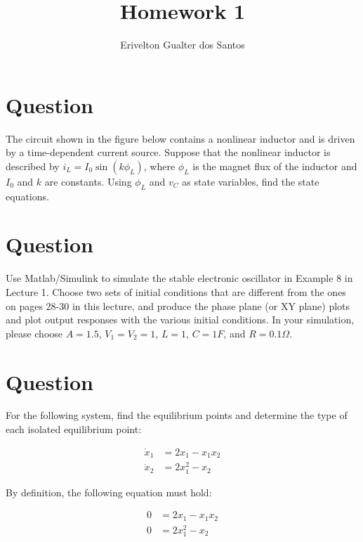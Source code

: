 \documentclass[a4paper,10pt]{article}
\title{Homework 1}
\author{Erivelton Gualter dos Santos}
\begin{document}
\maketitle

\begin{abstract}

\end{abstract}

\section{Question}

The circuit shown in the figure below contains a nonlinear inductor and is driven by a time-dependent current source. Suppose that the nonlinear inductor is described by $i_L =I_0\sin(k\phi_L)$, where $\phi_L$ is the magnet flux of the inductor and $I_0$ and $k$ are constants. Using $\phi_L$ and $v_C$ as state variables, find the state equations.

\section{Question}
Use Matlab/Simulink to simulate the stable electronic oscillator in Example 8 in Lecture 1. Choose two sets of initial conditions that are different from the ones on pages 28-30 in this lecture, and produce the phase plane (or XY plane) plots and
plot output responses with the various initial conditions. 
In your simulation, please choose $A=1.5$, $V_1 =V_2 =1$, $L=1$, $C=1F$, and $R=0.1\Omega$.

\section{Question}
For the following system, find the equilibrium points and determine the type of each isolated equilibrium point:

\begin{eqnarray*}
\dot{x}_1 &= 2{x}_1 - {x}_1{x}_2 \\
\dot{x}_2 &= 2{x}^2_1 - {x}_2 
\end{eqnarray*}

By definition, the following equation must hold:

\begin{eqnarray}
0 &= 2{x}_1 - {x}_1{x}_2 \label{eq:3a} \\ 
0 &= 2{x}^2_1 - {x}_2   \label{eq:3b}
\end{eqnarray}
\end{document}
